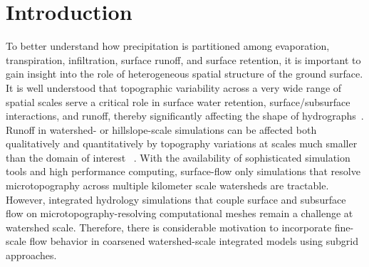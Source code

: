 \section{Introduction}\label{introduction}
To better understand how precipitation is partitioned among evaporation, transpiration, infiltration, surface runoff, and surface retention, it is important to gain insight into the role of heterogeneous spatial structure of the ground surface.
It is well understood that topographic variability across a very wide range of spatial scales serve a critical role in surface water retention, surface/subsurface interactions, and runoff, thereby significantly affecting the shape of hydrographs~\citet{toth1962theory,dunne1991effects,holden2005peatland, kvaerner2008generation, huang2009influences, andresen2015disappearing}.
Runoff in watershed- or hillslope-scale simulations can be affected both qualitatively and quantitatively by topography variations at scales much smaller than the domain of interest ~\citet{bronstert1997modelling,nakayama2006simulation}.
With the availability of sophisticated simulation tools and high performance computing, surface-flow only simulations that resolve microtopography across multiple kilometer scale watersheds are tractable.
However, integrated hydrology simulations that couple surface and subsurface flow on microtopography-resolving computational meshes remain a challenge at watershed scale.
Therefore, there is considerable motivation to incorporate fine-scale flow behavior in coarsened watershed-scale integrated models using subgrid approaches. 

